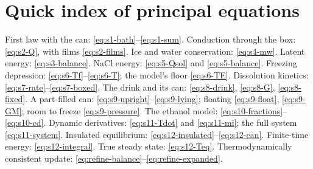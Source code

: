 \documentclass[11pt,a4paper]{article}
\begin{document}
\section{Quick index of principal equations}\label{sec:index}

First law with the can: \eqref{eq:s1-bath}--\eqref{eq:s1-sum}. Conduction through the box: \eqref{eq:s2-Q},
with films \eqref{eq:s2-films}. Ice and water conservation: \eqref{eq:s4-mw}. Latent energy:
\eqref{eq:s3-balance}. NaCl energy: \eqref{eq:s5-Qsol} and \eqref{eq:s5-balance}. Freezing depression:
\eqref{eq:s6-Tf}--\eqref{eq:s6-T}; the model's floor \eqref{eq:s6-TE}. Dissolution kinetics:
\eqref{eq:s7-rate}--\eqref{eq:s7-boxed}. The drink and its can: \eqref{eq:s8-drink}, \eqref{eq:s8-G},
\eqref{eq:s8-fixed}. A part-filled can: \eqref{eq:s9-upright}--\eqref{eq:s9-lying}; floating
\eqref{eq:s9-float}, \eqref{eq:s9-GM}; room to freeze \eqref{eq:s9-pressure}. The ethanol model:
\eqref{eq:s10-fractions}--\eqref{eq:s10-cd}. Dynamic derivatives: \eqref{eq:s11-Tdot} and \eqref{eq:s11-mi};
the full system \eqref{eq:s11-system}. Insulated equilibrium: \eqref{eq:s12-insulated}--\eqref{eq:s12-can}.
Finite-time energy: \eqref{eq:s12-integral}. True steady state: \eqref{eq:s12-Teq}. Thermodynamically
consistent update: \eqref{eq:refine-balance}--\eqref{eq:refine-expanded}.
\end{document}
